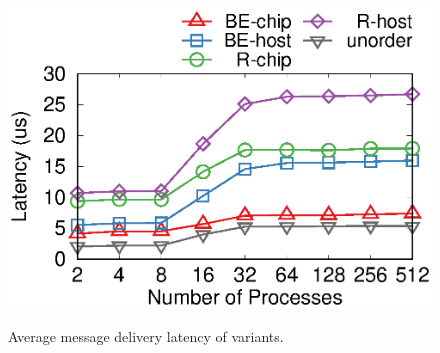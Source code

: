 \begin{figure}[t]
\begin{minipage}[]{.32\textwidth}
{			\includegraphics[width=\textwidth]{gnuplot/reorder_testbed.eps}
		}
		\newline
		\vspace{-5pt}
		\caption{Average message delivery latency of \sys{} variants.}
	\end{minipage}
	\hspace{0.01\textwidth}
	\begin{minipage}[]{.32\textwidth}

\end{minipage}
\end{figure}
